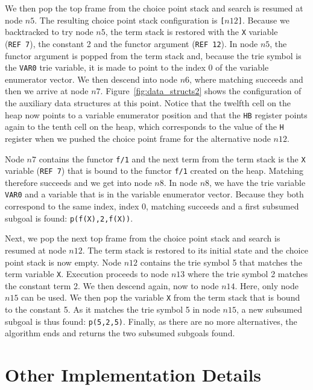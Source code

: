 We then pop the top frame from the choice point stack and search is
resumed at node $n5$. The resulting choice point stack configuration
is \texttt{[$n12$]}. Because we backtracked to try node $n5$, the term stack is
restored with the \texttt{X} variable (\texttt{REF~7}), the constant 2 and the
functor argument (\texttt{REF~12}). In node $n5$, the functor argument is
popped from the term stack and, because the trie symbol is the \texttt{VAR0}
trie variable, it is made to point to the index 0 of the variable
enumerator vector. We then descend into node $n6$, where matching
succeeds and then we arrive at node
$n7$. Figure~\ref{fig:data_structs2} shows the configuration of the
auxiliary data structures at this point. Notice that the twelfth cell
on the heap now points to a variable enumerator position and that the
\texttt{HB} register points again to the tenth cell on the heap, which
corresponds to the value of the \texttt{H} register when we pushed the choice
point frame for the alternative node $n12$.

Node $n7$ contains the functor \texttt{f/1} and the next term from the term
stack is the \texttt{X} variable (\texttt{REF~7}) that is bound to the functor \texttt{f/1}
created on the heap. Matching therefore succeeds and we get into node
$n8$. In node $n8$, we have the trie variable \texttt{VAR0} and a variable
that is in the variable enumerator vector. Because they both
correspond to the same index, index 0, matching succeeds and a first
subsumed subgoal is found: \texttt{p(f(X),2,f(X))}.

Next, we pop the next top frame from the choice point stack and search
is resumed at node $n12$. The term stack is restored to its initial
state and the choice point stack is now empty. Node $n12$ contains the
trie symbol 5 that matches the term variable \texttt{X}. Execution proceeds
to node $n13$ where the trie symbol 2 matches the constant term 2. We
then descend again, now to node $n14$. Here, only node $n15$ can be
used. We then pop the variable \texttt{X} from the term stack that is bound
to the constant 5. As it matches the trie symbol 5 in node $n15$, a
new subsumed subgoal is thus found: \texttt{p(5,2,5)}. Finally, as there are
no more alternatives, the algorithm ends and returns the two subsumed
subgoals found.

\section{Other Implementation Details}

